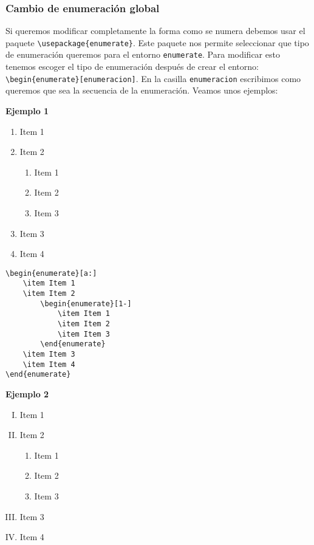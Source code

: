 	
	\subsubsection{Cambio de enumeración global}
	
	Si queremos modificar completamente la forma como se numera debemos usar el paquete \verb|\usepackage{enumerate}|. Este paquete nos permite seleccionar que tipo de enumeración queremos para el entorno \verb|enumerate|. Para modificar esto tenemos escoger el tipo de enumeración después de crear el entorno: \verb|\begin{enumerate}[enumeracion]|. En la casilla \verb|enumeracion| escribimos como queremos que sea la secuencia de la enumeración. Veamos unos ejemplos:
	
	\textbf{Ejemplo 1}
	
	\begin{enumerate}[a:]
		\item Item 1
		\item Item 2
		\begin{enumerate}[1-]
			\item Item 1
			\item Item 2
			\item Item 3
		\end{enumerate}
		\item Item 3
		\item Item 4
	\end{enumerate}
	
	\begin{myquote}
		\begin{lstlisting}
\begin{enumerate}[a:]
	\item Item 1
	\item Item 2
		\begin{enumerate}[1-]
			\item Item 1
			\item Item 2
			\item Item 3
		\end{enumerate}
	\item Item 3
	\item Item 4
\end{enumerate}
		\end{lstlisting}
	\end{myquote}
	
	\textbf{Ejemplo 2}
	
	\begin{enumerate}[I)]
		\item Item 1
		\item Item 2
		\begin{enumerate}[$\Delta$+]
			\item Item 1
			\item Item 2
			\item Item 3
		\end{enumerate}
		\item Item 3
		\item Item 4
	\end{enumerate}
	
